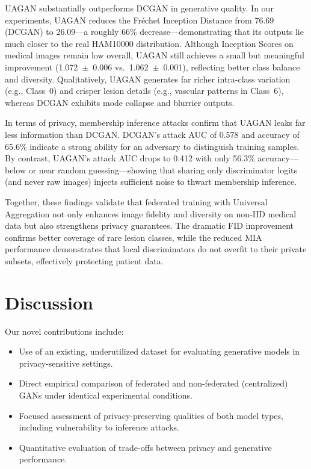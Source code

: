 \documentclass{article}
\begin{document}
UAGAN substantially outperforms DCGAN in generative quality. In our experiments, UAGAN reduces the Fréchet Inception Distance from 76.69 (DCGAN) to 26.09---a roughly 66\% decrease---demonstrating that its outputs lie much closer to the real HAM10000 distribution. Although Inception Scores on medical images remain low overall, UAGAN still achieves a small but meaningful improvement (1.072~$\pm$~0.006 vs.\ 1.062~$\pm$~0.001), reflecting better class balance and diversity. Qualitatively, UAGAN generates far richer intra-class variation (e.g., Class~0) and crisper lesion details (e.g., vascular patterns in Class~6), whereas DCGAN exhibits mode collapse and blurrier outputs.


In terms of privacy, membership inference attacks confirm that UAGAN leaks far less information than DCGAN.  DCGAN’s attack AUC of 0.578 and accuracy of 65.6\% indicate a strong ability for an adversary to distinguish training samples.  By contrast, UAGAN’s attack AUC drops to 0.412 with only 56.3\% accuracy—below or near random guessing—showing that sharing only discriminator logits (and never raw images) injects sufficient noise to thwart membership inference.

Together, these findings validate that federated training with Universal Aggregation not only enhances image fidelity and diversity on non‐IID medical data but also strengthens privacy guarantees.  The dramatic FID improvement confirms better coverage of rare lesion classes, while the reduced MIA performance demonstrates that local discriminators do not overfit to their private subsets, effectively protecting patient data.  


\section{Discussion}
Our novel contributions include:
\begin{itemize}
  \item Use of an existing, underutilized dataset for evaluating generative models in privacy-sensitive settings.
  \item Direct empirical comparison of federated and non-federated (centralized) GANs under identical experimental conditions.
  \item Focused assessment of privacy-preserving qualities of both model types, including vulnerability to inference attacks.
  \item Quantitative evaluation of trade-offs between privacy and generative performance.
\end{itemize}
\end{document}
